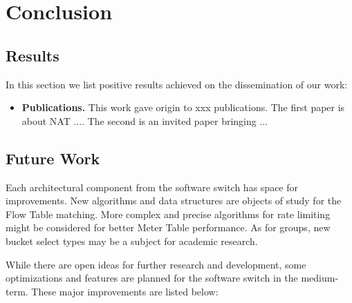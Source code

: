 \chapter{Conclusion}
\label{cap:conclusion}



\section{Results}
\label{sec:results}

In this section we list positive results achieved on the dissemination of our work:  

\begin{itemize}

\item \textbf{Publications.} This work gave origin to xxx publications. The first paper is about NAT .... The second is an invited paper bringing ...  
\end{itemize}



\section{Future Work}

Each architectural component from the software switch has space for improvements. New algorithms and data structures are objects of study for the Flow Table matching. More complex and precise algorithms for rate limiting might be considered for better Meter Table performance. As for groups, new bucket select types may be a subject for academic research. 

While there are open ideas for further research and development, some optimizations and features are planned for the software switch in the medium-term. These major improvements are listed below:


